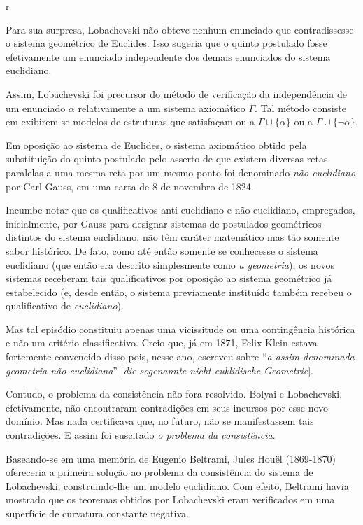r\documentclass{hipatia}
\begin{document}
Para sua surpresa, Lobachevski não obteve nenhum enunciado que contradissesse o sistema geométrico de Euclides. Isso sugeria que o quinto postulado fosse efetivamente um enunciado independente dos demais enunciados do sistema euclidiano. 

Assim, Lobachevski foi precursor do método de verificação da independência de um enunciado $\alpha$ relativamente a um sistema axiomático $\Gamma$. Tal método consiste em exibirem-se modelos de estruturas que satisfaçam ou a $\Gamma\cup\{\alpha\}$ ou a $\Gamma\cup\{\neg\alpha\}$. 


Em oposição ao sistema de Euclides, o sistema axiomático obtido pela substituição do quinto postulado pelo asserto de que existem diversas retas paralelas a uma mesma reta por um mesmo ponto foi denominado \emph{não euclidiano} por Carl Gauss, em uma carta de 8 de novembro de 1824.  \cite[p. 39]{barbosa1995} 

Incumbe notar que os qualificativos anti-euclidiano e não-euclidiano, empregados, inicialmente, por Gauss para designar sistemas de postulados geométricos distintos do sistema euclidiano, não têm caráter matemático mas tão somente sabor histórico. De fato, como até então somente se conhecesse o sistema euclidiano  (que então era descrito simplesmente como \emph{a geometria}), os novos sistemas receberam tais qualificativos por oposição ao sistema geométrico já estabelecido (e, desde então, o sistema previamente instituído também recebeu o qualificativo de \emph{euclidiano}). 

Mas tal episódio constituiu apenas uma vicissitude ou uma contingência histórica e não um critério classificativo. Creio que, já em 1871, Felix Klein estava fortemente convencido disso pois, nesse ano, escreveu sobre ``\emph{a assim denominada geometria não euclidiana}'' [\emph{die sogenannte nicht-euklidische Geometrie}].  \cite[p. 67]{bonola1906}\cite[p. 214]{yaglom}  

Contudo, o problema da consistência não fora resolvido. Bolyai e Lobachevski, efetivamente, não encontraram contradições em seus incursos por esse novo domínio. Mas nada certificava que, no futuro, não se manifestassem tais contradições. E assim foi suscitado \emph{o problema da consistência}.  \cite[p.  388]{kneale}  

Baseando-se em uma memória de Eugenio Beltrami, Jules Houël (1869-1870) ofereceria a primeira solução ao problema da consistência do sistema de Lobachevski, construindo-lhe um modelo euclidiano. Com efeito, Beltrami havia mostrado que os teoremas obtidos por Lobachevski eram verificados em uma superfície de curvatura constante negativa.  \cite[p. 320--321]{kagan1986}\cite[p. 32--33]{carmo1988}  
\end{document}
